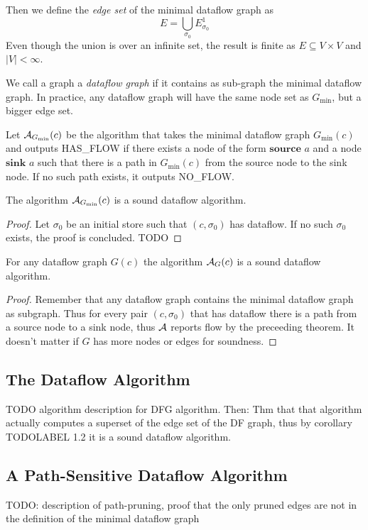 Then we define the \emph{edge set} of the minimal dataflow graph as
\begin{equation*}
    E = \bigcup_{\sigma_0} E^1_{\sigma_0}
\end{equation*}
Even though the union is over an infinite set, the result is finite
as $E \subseteq V \times V$ and $|V| < \infty$.

We call a graph a \emph{dataflow graph} if it contains as sub-graph the 
minimal dataflow graph.
In practice, any dataflow graph will have the same node set as $G_{\text{min}}$,
but a bigger edge set.

Let $\operatorname{\mathcal{A}}_{G_\text{min}}(c)$ be the algorithm that takes the
minimal dataflow graph $G_\text{min}(c)$ and outputs HAS\_FLOW if there 
exists a node of the form 
$\textbf{source }a$ and a node $\textbf{sink }a$ such that there is a path in 
$G_\text{min}(c)$ from the source node to the sink node.
If no such path exists, it outputs NO\_FLOW.

\begin{theorem}
    The algorithm $\operatorname{\mathcal{A}}_{G_\text{min}}(c)$ is a sound dataflow algorithm.
\end{theorem}
\begin{proof}
    Let $\sigma_0$ be an initial store such that $(c, \sigma_0)$ has dataflow.
    If no such $\sigma_0$ exists, the proof is concluded.
    TODO
\end{proof}

\begin{corollary}
    For any dataflow graph $G(c)$ the algorithm $\operatorname{\mathcal{A}}_{G}(c)$ is a sound
     dataflow algorithm.
\end{corollary}
\begin{proof}
    Remember that any dataflow graph contains the minimal dataflow graph as 
    subgraph. Thus for every pair $(c, \sigma_0)$ that has dataflow
    there is a path from a source node to a sink node, 
    thus $\operatorname{\mathcal{A}}$ reports flow by the preceeding theorem.
    It doesn't matter if $G$ has more nodes or edges for soundness.
\end{proof}

\subsection{The Dataflow Algorithm}
TODO algorithm description for DFG algorithm.
Then: Thm that that algorithm actually computes a superset of the edge set of 
the DF graph, thus by corollary TODOLABEL 1.2 it is a sound dataflow algorithm.


\subsection{A Path-Sensitive Dataflow Algorithm}
TODO: description of path-pruning, proof that the only pruned edges are not
in the definition of the minimal dataflow graph

